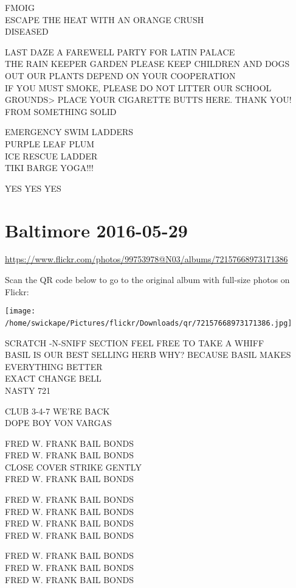 \documentclass[10pt,letterpaper]{article}
\begin{document}
FMOIG\\
ESCAPE THE HEAT WITH AN ORANGE CRUSH\\
DISEASED

LAST DAZE A FAREWELL PARTY FOR LATIN PALACE\\
THE RAIN KEEPER GARDEN PLEASE KEEP CHILDREN AND DOGS OUT OUR PLANTS DEPEND ON YOUR COOPERATION\\
IF YOU MUST SMOKE, PLEASE DO NOT LITTER OUR SCHOOL GROUNDS>  PLACE YOUR CIGARETTE BUTTS HERE.  THANK YOU!\\
FROM SOMETHING SOLID

EMERGENCY SWIM LADDERS\\
PURPLE LEAF PLUM\\
ICE RESCUE LADDER\\
TIKI BARGE YOGA!!!

YES YES YES
\

\section*{Baltimore 2016-05-29}

\url{https://www.flickr.com/photos/99753978@N03/albums/72157668973171386}

Scan the QR code below to go to the original album with full-size photos on Flickr:

\texttt{[image: /home/swickape/Pictures/flickr/Downloads/qr/72157668973171386.jpg]}
\

SCRATCH {-}N{-}SNIFF SECTION FEEL FREE TO TAKE A WHIFF\\
BASIL IS OUR BEST SELLING HERB WHY?  BECAUSE BASIL MAKES EVERYTHING BETTER\\
EXACT CHANGE BELL\\
NASTY 721

CLUB 3{-}4{-}7 WE'RE BACK\\
DOPE BOY VON VARGAS

FRED W. FRANK BAIL BONDS\\
FRED W. FRANK BAIL BONDS\\
CLOSE COVER STRIKE GENTLY\\
FRED W. FRANK BAIL BONDS

FRED W. FRANK BAIL BONDS\\
FRED W. FRANK BAIL BONDS\\
FRED W. FRANK BAIL BONDS\\
FRED W. FRANK BAIL BONDS

FRED W. FRANK BAIL BONDS\\
FRED W. FRANK BAIL BONDS\\
FRED W. FRANK BAIL BONDS
\end{document}
